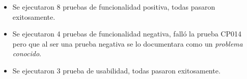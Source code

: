 %
%
%
%
%
%


\begin{itemize}
  \item Se ejecutaron 8 pruebas de funcionalidad positiva, todas pasaron exitosamente.
  \item Se ejecutaron 4 pruebas de funcionalidad negativa, falló la prueba CP014 pero que al ser una prueba negativa se lo documentara como un \emph{problema conocido}.
  \item Se ejecutaron 3 prueba de usabilidad, todas pasaron exitosamente.
\end{itemize}

